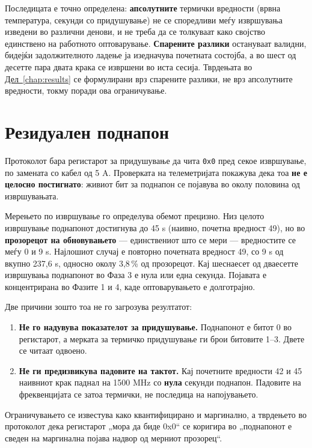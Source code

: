 Последицата е точно определена: \textbf{апсолутните} термички вредности (врвна температура,
секунди со придушување) не се споредливи меѓу извршувања изведени во различни денови, и не
треба да се толкуваат како својство единствено на работното оптоварување. \textbf{Спарените
разлики} остануваат валидни, бидејќи задолжителното ладење ја изедначува почетната
состојба, а во шест од десетте пара двата крака се извршени во иста сесија. Тврдењата во
\hyperref[chap:results]{Дел~\ref*{chap:results}} се формулирани врз спарените разлики, не врз апсолутните вредности, токму
поради ова ограничување.

\section{Резидуален поднапон}

Протоколот бара регистарот за придушување да чита \texttt{0x0} пред секое извршување, по
замената со кабел од 5 A. Проверката на телеметријата покажува дека тоа \textbf{не е целосно
постигнато}: живиот бит за поднапон се појавува во околу половина од извршувањата.

Мерењето по извршување го определува обемот прецизно. Низ целото извршување поднапонот
достигнува до 45 s (наивно, почетна вредност 49), но во \textbf{прозорецот на обновувањето} --- единствениот што се мери --- вредностите се меѓу 0 и 9 s. Најлошиот случај е повторно
почетната вредност 49, со 9 s од вкупно 237,6 s, односно околу 3,8\,\% од прозорецот. Кај
шеснаесет од дваесетте извршувања поднапонот во Фаза 3 е нула или една секунда. Појавата е
концентрирана во Фазите 1 и 4, каде оптоварувањето е долготрајно.

Две причини зошто тоа не го загрозува резултатот:

\begin{enumerate}
  \item \textbf{Не го надувува показателот за придушување.} Поднапонот е битот 0 во регистарот, а мерката за термичко придушување ги брои битовите 1–3. Двете се читаат одвоено.
  \item \textbf{Не ги предизвикува падовите на тактот.} Кај почетните вредности 42 и 45 наивниот крак паднал на 1500 MHz со \textbf{нула} секунди поднапон. Падовите на фреквенцијата се затоа термички, не последица на напојувањето.
\end{enumerate}

Ограничувањето се известува како квантифицирано и маргинално, а тврдењето во протоколот
дека регистарот „мора да биде 0x0“ се коригира во „поднапонот е сведен на маргинална појава
надвор од мерниот прозорец“.


